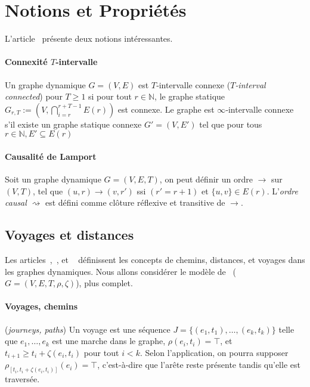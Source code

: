\documentclass[12pt,a4paper]{article}
\begin{document}
\section{Notions et Propriétés}

L'article~\cite{kuhn2010distributed} présente deux notions intéressantes.

\paragraph{Connexité \(T\)‑intervalle}
Un graphe dynamique \(G = (V, E)\) est \(T\)‑intervalle connexe
(\textit{\(T\)‑interval connected}) pour \(T \geq 1\) si pour tout
\(r \in \mathbb{N}\), le graphe statique
\(G_{r,T} := (V, \bigcap_{i=r}^{r+T-1} E(r))\) est connexe. Le graphe
est \(\infty\)‑intervalle connexe s'il existe un graphe statique
connexe \(G' = (V, E')\) tel que pour tous
\(r \in \mathbb{N}, E' \subseteq E(r)\)

\paragraph{Causalité de Lamport}
Soit un graphe dynamique \(G = (V, E, T)\), on peut définir un ordre
\(\rightarrow\) sur \((V, T)\), tel que
\((u, r) \rightarrow (v, r')\) ssi \((r' = r + 1)\) et
\(\{u, v\} \in E(r)\). L'\textit{ordre causal} \(\rightsquigarrow\)
est défini comme clôture réflexive et transitive de \(\rightarrow\).

\subsection{Voyages et distances}

Les articles~\cite{xuan2003computing},~\cite{casteigts2012time}, et
~\cite{latapy2017stream} définissent les concepts de chemins,
distances, et voyages dans les graphes dynamiques. Nous allons
considérer le modèle de~\cite{casteigts2012time}
(\(G = (V, E, T, \rho, \zeta)\)), plus complet.

\paragraph{Voyages, chemins} (\textit{journeys, paths}) Un voyage est
une séquence \(J = \{(e_1, t_1), \dots, (e_k, t_k)\}\) telle que
\({e_1, \dots, e_k}\) est une marche dans le graphe,
\(\rho(e_i, t_i) = \top\), et \(t_{i+1} \geq t_i + \zeta(e_i, t_i)\)
pour tout \(i < k\). Selon l'application, on pourra supposer
\(\rho_{[t_i, t_i + \zeta(e_i, t_i)]}(e_i) = \top\), c'est-à-dire que
l'arête reste présente tandis qu'elle est traversée.
\end{document}
